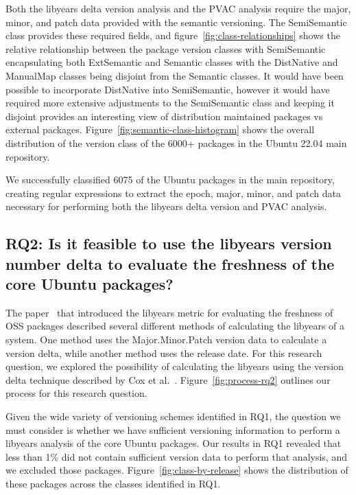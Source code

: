 \documentclass[sn-mathphys-num]{sn-jnl}%
\theoremstyle{thmstyleone}%
\theoremstyle{thmstyletwo}%
\theoremstyle{thmstylethree}%
\begin{document}
Both the libyears delta version analysis and the PVAC analysis require the major, minor, and patch data provided with the semantic versioning. The SemiSemantic class provides these required fields, and figure~\ref{fig:class-relationships} shows the relative relationship between the package version classes with SemiSemantic encapsulating both ExtSemantic and Semantic classes with the DistNative and ManualMap classes being disjoint from the Semantic classes. It would have been possible to incorporate DistNative into SemiSemantic, however it would have required more extensive adjustments to the SemiSemantic class and keeping it disjoint provides an interesting view of distribution maintained packages vs external packages. Figure~\ref{fig:semantic-class-histogram} shows the overall distribution of the version class of the 6000+ packages in the Ubuntu 22.04 main repository.

\begin{tcolorbox}[enhanced,attach boxed title to top center={yshift=-3mm,yshifttext=-1mm}, colback=blue!5!white,colframe=blue!75!black,colbacktitle=red!80!black, title=Answer to RQ1,fonttitle=\bfseries, boxed title style={size=small,colframe=red!50!black} ]

   We successfully classified 6075 of the Ubuntu packages in the main repository, creating regular expressions to extract the epoch, major, minor, and patch data necessary for performing both the libyears delta version and PVAC analysis.

\end{tcolorbox}

\subsection{\textbf{RQ2: Is it feasible to use the libyears version number delta to evaluate the freshness of the core Ubuntu packages?}}

The paper~\cite{cox_measuring_2015} that introduced the libyears metric for evaluating the freshness of OSS packages described several different methods of calculating the libyears of a system. One method uses the Major.Minor.Patch version data to calculate a version delta, while another method uses the release date. For this research question, we explored the possibility of calculating the libyears using the version delta technique described by Cox et al.~\cite{cox_measuring_2015}.  Figure~\ref{fig:process-rq2} outlines our process for this research question. 

Given the wide variety of versioning schemes identified in RQ1, the question we must consider is whether we have sufficient versioning information to perform a libyears analysis of the core Ubuntu packages. Our results in RQ1 revealed that less than 1\% did not contain sufficient version data to perform that analysis, and we excluded those packages. Figure~\ref{fig:class-by-release} shows the distribution of these packages across the classes identified in RQ1.
\end{document}
